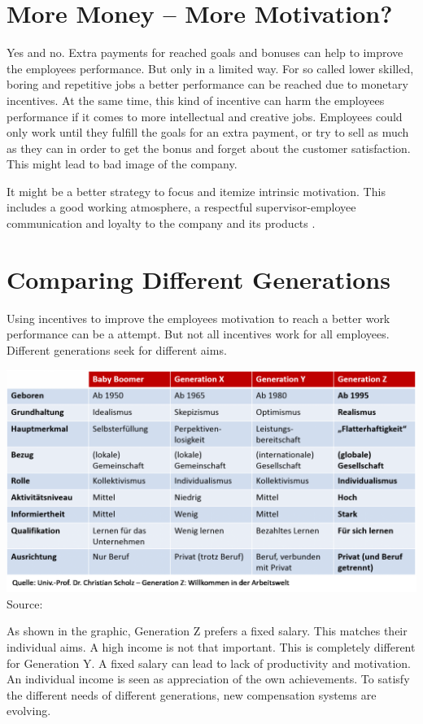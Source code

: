 \documentclass[11pt,a4paper]{article}
\begin{document}
\section{More Money -- More Motivation?}
Yes and no. Extra payments for reached goals and bonuses can help to improve
the employees performance. But only in a limited way. For so called lower
skilled, boring and repetitive jobs a better performance can be reached due to
monetary incentives. At the same time, this kind of incentive can harm the
employees performance if it comes to more intellectual and creative jobs.
Employees could only work until they fulfill the goals for an extra payment,
or try to sell as much as they can in order to get the bonus and forget about
the customer satisfaction. This might lead to bad image of the company.

It might be a better strategy to focus and itemize intrinsic motivation.  This
includes a good working atmosphere, a respectful supervisor-employee
communication and loyalty to the company and its products \cite{Solbach}.

\section{Comparing Different Generations}
Using incentives to improve the employees motivation to reach a better work
performance can be a attempt. But not all incentives work for all employees.
Different generations seek for different aims.
\begin{center}
  \includegraphics[width=1.0\textwidth]{Generationentabelle.png}\\
  Source: \cite{GenZ}
\end{center}
As shown in the graphic, Generation Z prefers a fixed salary. This matches
their individual aims. A high income is not that important. This is completely
different for Generation Y. A fixed salary can lead to lack of productivity
and motivation. An individual income is seen as appreciation of the own
achievements. To satisfy the different needs of different generations, new
compensation systems are evolving.
\end{document}
